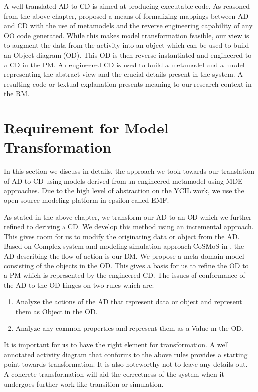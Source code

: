\documentclass[10pt]{article}
\begin{document}
A well translated AD to CD is aimed at producing executable code. As reasoned from the above chapter,  \cite{Barros_fromactivity} proposed a means of formalizing mappings between AD and CD with the use of metamodels and the reverse engineering capability of any OO code generated.  While this makes model transformation feasible, our view is to augment the data from the activity into an object which can be used to build an Object diagram (OD). This OD is then reverse-instantiated and engineered to a CD in the PM. An engineered CD is used to build a metamodel and a model representing the abstract view and the crucial details present in the system. A resulting code or textual explanation presents meaning to our research context in the RM.

\section{Requirement for Model Transformation}
In this section we discuss in details, the approach we took towards our translation of AD to CD using models derived from an engineered metamodel using MDE approaches. Due to the high level of abstraction on the YCIL work, we use the open source modeling platform in epsilon called EMF.

As stated in the above chapter, we transform our AD to an OD which we further refined to deriving a CD. We develop this method using an incremental approach. This gives room for us to modify the originating data or object from the AD. Based on Complex system and modeling simulation approach CoSMoS in \cite{cosmos:tech-report}, the AD describing the flow of action is our DM. We propose a meta-domain model consisting of the objects in the OD. This gives a basis for us to refine the OD to a PM which is represented by the engineered CD. The issues of conformance of the AD to the OD hinges on two rules which are:
\begin{enumerate}
\item Analyze the actions of the AD that represent data or object and represent them as Object in the OD.
\item Analyze any common properties and represent them as a Value in the OD.
\end{enumerate}
It is important for us to have the right element for transformation. A well annotated activity diagram that conforms to the above rules provides a starting point towards transformation. It is also noteworthy not to leave any details out. A concrete transformation will aid the correctness of the system when it undergoes further work like transition or simulation.
\end{document}

